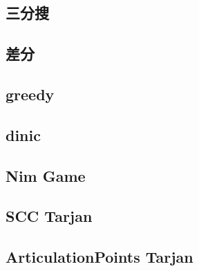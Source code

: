     \subsection{三分搜}
        
    \subsection{差分}
        
    \subsection{greedy}
        
    \subsection{dinic}
        
    \subsection{Nim Game}
        
    \subsection{SCC Tarjan}
        
    \subsection{ArticulationPoints Tarjan}
        
